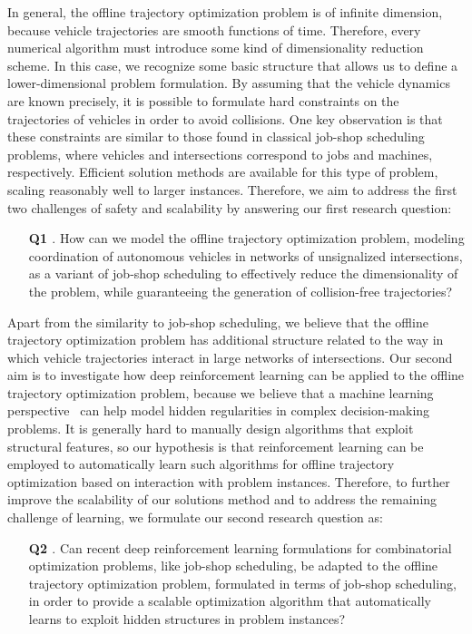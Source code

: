 \documentclass{article}
\makeatletter
\def\namedlabel#1#2{\begingroup
    #2%
    \def\@currentlabel{#2}%
    \phantomsection\label{#1}\endgroup
}
\theoremstyle{definition}
\theoremstyle{plain}
\makeatother
\begin{document}
In general, the offline trajectory optimization problem is of infinite
dimension, because vehicle trajectories are smooth functions of time. Therefore,
every numerical algorithm must introduce some kind of dimensionality reduction
scheme. In this case, we recognize some basic structure that allows us to define
a lower-dimensional problem formulation.
%
By assuming that the vehicle dynamics are known precisely, it is possible to
formulate hard constraints on the trajectories of vehicles in order to avoid
collisions. One key observation is that these constraints are similar
to those found in classical job-shop scheduling problems, where vehicles and
intersections correspond to jobs and machines, respectively. Efficient solution
methods are available for this type of problem, scaling reasonably well to
larger instances.
%
Therefore, we aim to address the first two challenges of safety and scalability
by answering our first research question:
%
\begin{enumerate}
  \item[\textbf{\namedlabel{Q1}{Q1}}.] How can we model the offline trajectory optimization
        problem, modeling coordination of autonomous vehicles in networks of
        unsignalized intersections, as a variant of job-shop scheduling to
        effectively reduce the dimensionality of the problem, while guaranteeing
        the generation of collision-free trajectories?
\end{enumerate}

Apart from the similarity to job-shop scheduling, we believe that the offline
trajectory optimization problem has additional structure related to the way in
which vehicle trajectories interact in large networks of intersections. Our
second aim is to investigate how deep reinforcement learning can be applied to
the offline trajectory optimization problem, because we believe that a machine
learning perspective~\cite{bengioMachineLearningCombinatorial2020} can help model hidden regularities in complex
decision-making problems. It is generally hard to
manually design algorithms that exploit structural features, so
our hypothesis is that reinforcement learning can be employed to automatically learn such algorithms for offline trajectory optimization based
on interaction with problem instances. Therefore, to further improve the scalability of
our solutions method and to address the remaining challenge of learning, we
formulate our second research question as:
%
\begin{enumerate}
  \item[\textbf{\namedlabel{Q2}{Q2}}.] Can recent deep reinforcement learning formulations for
        combinatorial optimization problems, like job-shop scheduling, be
        adapted to the offline trajectory optimization problem, formulated in
        terms of job-shop scheduling, in order to provide a scalable
        optimization algorithm that automatically learns to exploit hidden
        structures in problem instances?
\end{enumerate}
\end{document}
